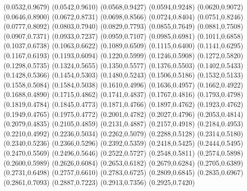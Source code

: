 \PST@ThickBorder(0.0532,0.9679)
(0.0542,0.9610)
(0.0568,0.9427)
(0.0594,0.9248)
(0.0620,0.9072)
(0.0646,0.8900)
(0.0672,0.8731)
(0.0698,0.8566)
(0.0724,0.8404)
(0.0751,0.8246)
(0.0777,0.8092)
(0.0803,0.7940)
(0.0829,0.7793)
(0.0855,0.7649)
(0.0881,0.7508)
(0.0907,0.7371)
(0.0933,0.7237)
(0.0959,0.7107)
(0.0985,0.6981)
(0.1011,0.6858)
(0.1037,0.6738)
(0.1063,0.6622)
(0.1089,0.6509)
(0.1115,0.6400)
(0.1141,0.6295)
(0.1167,0.6193)
(0.1193,0.6094)
(0.1220,0.5999)
(0.1246,0.5908)
(0.1272,0.5820)
(0.1298,0.5735)
(0.1324,0.5655)
(0.1350,0.5577)
(0.1376,0.5503)
(0.1402,0.5433)
(0.1428,0.5366)
(0.1454,0.5303)
(0.1480,0.5243)
(0.1506,0.5186)
(0.1532,0.5133)
(0.1558,0.5084)
(0.1584,0.5038)
(0.1610,0.4996)
(0.1636,0.4957)
(0.1662,0.4922)
(0.1688,0.4890)
(0.1715,0.4862)
(0.1741,0.4837)
(0.1767,0.4816)
(0.1793,0.4798)
(0.1819,0.4784)
(0.1845,0.4773)
(0.1871,0.4766)
(0.1897,0.4762)
(0.1923,0.4762)
(0.1949,0.4765)
(0.1975,0.4772)
(0.2001,0.4782)
(0.2027,0.4796)
(0.2053,0.4814)
(0.2079,0.4835)
(0.2105,0.4859)
(0.2131,0.4887)
(0.2157,0.4918)
(0.2184,0.4953)
(0.2210,0.4992)
(0.2236,0.5034)
(0.2262,0.5079)
(0.2288,0.5128)
(0.2314,0.5180)
(0.2340,0.5236)
(0.2366,0.5296)
(0.2392,0.5359)
(0.2418,0.5425)
(0.2444,0.5495)
(0.2470,0.5569)
(0.2496,0.5646)
(0.2522,0.5727)
(0.2548,0.5811)
(0.2574,0.5898)
(0.2600,0.5989)
(0.2626,0.6084)
(0.2653,0.6182)
(0.2679,0.6284)
(0.2705,0.6389)
(0.2731,0.6498)
(0.2757,0.6610)
(0.2783,0.6725)
(0.2809,0.6845)
(0.2835,0.6967)
(0.2861,0.7093)
(0.2887,0.7223)
(0.2913,0.7356)
(0.2925,0.7420)

